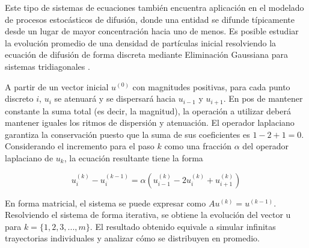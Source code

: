 Este tipo de sistemas de ecuaciones también encuentra aplicación en el modelado de procesos estocásticos de difusión, donde una entidad se difunde típicamente
desde un lugar de mayor concentración hacia uno de menos. Es posible estudiar la evolución promedio de una densidad de partículas inicial resolviendo la ecuación de difusión de forma discreta
mediante Eliminación Gaussiana para sistemas tridiagonales \cite{langtangen-difusion}.

A partir de un vector inicial $u^{(0)}$ con magnitudes positivas, para cada punto discreto $i$, $u_{i}$ se atenuará y se dispersará hacia $u_{i-1}$ y $u_{i+1}$. En pos de mantener constante la suma total (es decir, la magnitud), la operación a utilizar deberá mantener iguales los ritmos de dispersión y atenuación. El operador laplaciano garantiza la conservación puesto que la suma de sus coeficientes es $1 - 2 + 1 = 0$. Considerando el incremento para el paso $k$ como una
fracción $\alpha$ del operador laplaciano de $u_{k}$, la ecuación resultante tiene la forma

\begin{equation} \label{eq:difusion}
	u_{i}^{(k)} - u_{i}^{(k-1)} = \alpha (u_{i-1}^{(k)} - 2 u_{i}^{(k)} + u_{i+1}^{(k)})
\end{equation}

En forma matricial, el sistema se puede expresar como $A u^{(k)} = u^{(k-1)}$. Resolviendo el sistema de forma iterativa, se obtiene la
evolución del vector u para $k = \{1, 2, 3, ..., m\}$. El resultado obtenido equivale a simular infinitas trayectorias individuales y analizar cómo se
distribuyen en promedio.